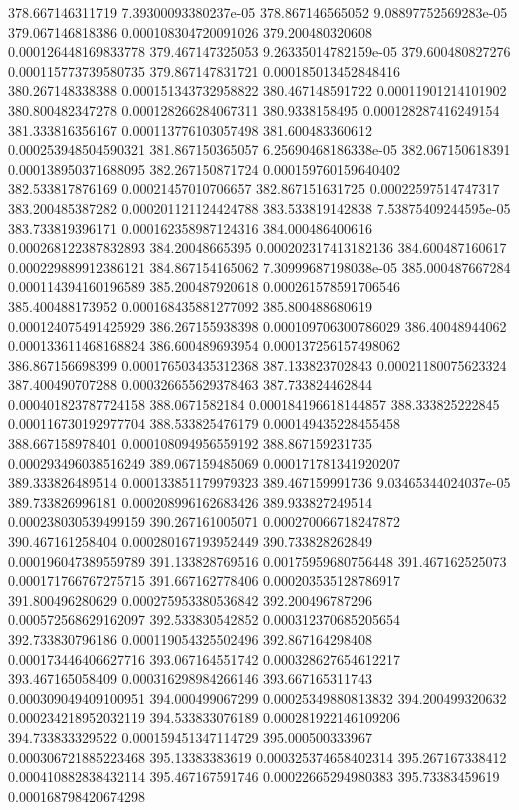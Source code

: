 {378.667146311719 7.39300093380237e-05
378.867146565052 9.08897752569283e-05
379.067146818386 0.000108304720091026
379.200480320608 0.000126448169833778
379.467147325053 9.26335014782159e-05
379.600480827276 0.000115773739580735
379.867147831721 0.000185013452848416
380.267148338388 0.000151343732958822
380.467148591722 0.00011901214101902
380.800482347278 0.000128266284067311
380.9338158495 0.000128287416249154
381.333816356167 0.000113776103057498
381.600483360612 0.000253948504590321
381.867150365057 6.25690468186338e-05
382.067150618391 0.000138950371688095
382.267150871724 0.000159760159640402
382.533817876169 0.00021457010706657
382.867151631725 0.00022597514747317
383.200485387282 0.000201121124424788
383.533819142838 7.53875409244595e-05
383.733819396171 0.000162358987124316
384.000486400616 0.000268122387832893
384.20048665395 0.000202317413182136
384.600487160617 0.000229889912386121
384.867154165062 7.30999687198038e-05
385.000487667284 0.000114394160196589
385.200487920618 0.000261578591706546
385.400488173952 0.000168435881277092
385.800488680619 0.000124075491425929
386.267155938398 0.000109706300786029
386.40048944062 0.000133611468168824
386.600489693954 0.000137256157498062
386.867156698399 0.000176503435312368
387.133823702843 0.00021180075623324
387.400490707288 0.000326655629378463
387.733824462844 0.000401823787724158
388.0671582184 0.000184196618144857
388.333825222845 0.000116730192977704
388.533825476179 0.000149435228455458
388.667158978401 0.000108094956559192
388.867159231735 0.000293496038516249
389.067159485069 0.000171781341920207
389.333826489514 0.000133851179979323
389.467159991736 9.03465344024037e-05
389.733826996181 0.000208996162683426
389.933827249514 0.000238030539499159
390.267161005071 0.000270066718247872
390.467161258404 0.000280167193952449
390.733828262849 0.000196047389559789
391.133828769516 0.00175959680756448
391.467162525073 0.000171766767275715
391.667162778406 0.000203535128786917
391.800496280629 0.000275953380536842
392.200496787296 0.000572568629162097
392.533830542852 0.000312370685205654
392.733830796186 0.000119054325502496
392.867164298408 0.000173446406627716
393.067164551742 0.000328627654612217
393.467165058409 0.000316298984266146
393.667165311743 0.000309049409100951
394.000499067299 0.00025349880813832
394.200499320632 0.000234218952032119
394.533833076189 0.000281922146109206
394.733833329522 0.000159451347114729
395.000500333967 0.000306721885223468
395.13383383619 0.000325374658402314
395.267167338412 0.000410882838432114
395.467167591746 0.00022665294980383
395.73383459619 0.000168798420674298
}
